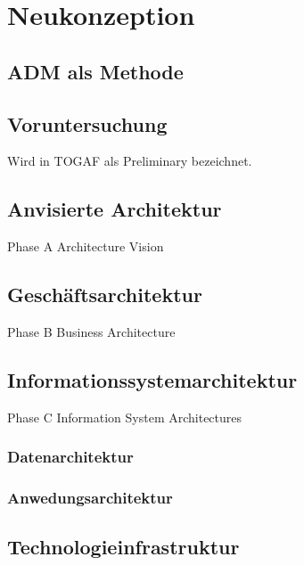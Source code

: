 \chapter{Neukonzeption}

\section{ADM als Methode}

\section{Voruntersuchung}

Wird in TOGAF als Preliminary bezeichnet.

\section{Anvisierte Architektur}
Phase A Architecture Vision
\section{Geschäftsarchitektur}
Phase B Business Architecture

\section{Informationssystemarchitektur}
Phase C Information System Architectures

\subsection{Datenarchitektur}

\subsection{Anwedungsarchitektur}

\section{Technologieinfrastruktur}